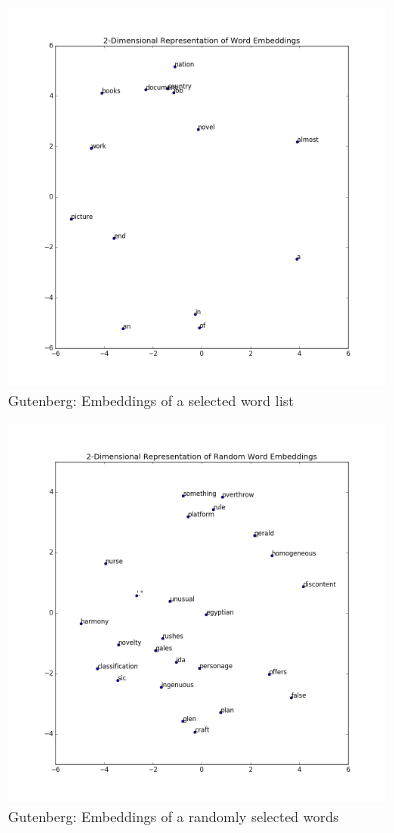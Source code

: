 \documentclass[a4paper]{article}
\begin{document}
\begin{figure}[H]
  \includegraphics[width=10cm]{../plots/gutenberg_word_list_embeddings.png}
  \centering
  \caption{Gutenberg: Embeddings of a selected word list}
  \label{fig:boat1}
\end{figure}

\begin{figure}[H]
  \includegraphics[width=10cm]{../plots/gutenberg_random_word_embeddings.png}
  \centering
  \caption{Gutenberg: Embeddings of a randomly selected words}
  \label{fig:boat1}
\end{figure}
\end{document}
